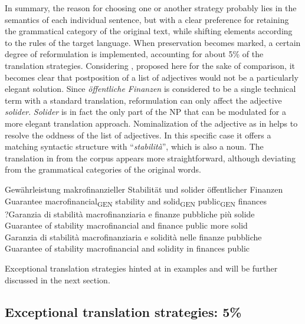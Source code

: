 \documentclass[output=paper,colorlinks,citecolor=brown]{langscibook}
\begin{document}
In summary, the reason for choosing one or another strategy probably lies in the semantics of each individual sentence, but with a clear preference for retaining the grammatical category of the original text, while shifting elements according to the rules of the target language. When preservation becomes marked, a certain degree of reformulation is implemented, accounting for about 5\% of the translation strategies. Considering , proposed here for the sake of comparison, it becomes clear that postposition of a list of adjectives would not be a particularly elegant solution. Since \textit{öffentliche Finanzen} is considered to be a single technical term with a standard translation, reformulation can only affect the adjective \textit{solider}. \textit{Solider} is in fact the only part of the NP that can be modulated for a more elegant translation approach. Nominalization of the adjective as in  helps to resolve the oddness of the list of adjectives. In this specific case it offers a matching syntactic structure with “\textit{stabilità}”, which is also a noun. The translation in  from the corpus appears more straightforward, although deviating from the grammatical categories of the original words.

\ea%
    \label{ex:resi:52}
\ea\label{ex:resi:52a}
\gll  Gewährleistung  makrofinanzieller  Stabilität  und  solider  öffentlicher  Finanzen \\
    Guarantee       macrofinancial\textsubscript{GEN} stability  and  solid\textsubscript{GEN} public\textsubscript{GEN} finances \\
\ex\label{ex:resi:52b}
\gll  ?Garanzia  di  stabilità  macrofinanziaria  e  finanze  pubbliche  più  solide\\
      Guarantee  of  stability  macrofinancial  and  finance  public  more  solid\\
\ex\label{ex:resi:52c}
\gll  Garanzia  di  stabilità  macrofinanziaria  e  solidità  nelle  finanze  pubbliche\\
    Guarantee  of  stability  macrofinancial  and  solidity  in  finances  public\\
  \z
\z

Exceptional translation strategies hinted at in examples  and  will be further discussed in the next section.

\subsection{Exceptional translation strategies: 5\%}\label{sec:5.3}
\end{document}
